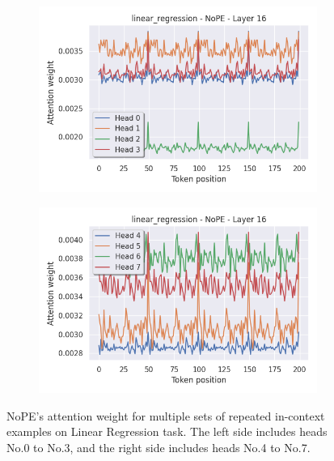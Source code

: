 \documentclass[letterpaper]{article} %
\begin{document}
\begin{figure}[tp]
    \begin{subfigure}[t]{0.48\linewidth}
        \includegraphics[width=\linewidth]{AnonymousSubmission/LaTeX/imgs/analysis/nope_head0.png}
    \end{subfigure}
    \begin{subfigure}[t]{0.48\linewidth}
        \includegraphics[width=\linewidth]{AnonymousSubmission/LaTeX/imgs/analysis/nope_head4.png}
    \end{subfigure}
    \caption{NoPE's attention weight for multiple sets of repeated in-context examples on Linear Regression task. The left side includes heads No.0 to No.3, and the right side includes heads No.4 to No.7.}
    \label{fig:nope_attn}
\end{figure}
\end{document}
